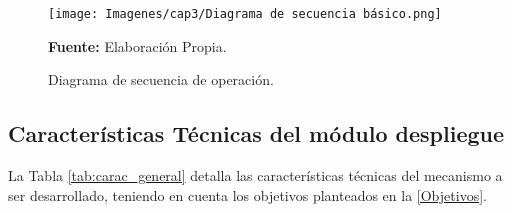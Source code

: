 \begin{figure}[H]
    \centering
    \texttt{[image: Imagenes/cap3/Diagrama de secuencia básico.png]}
    \caption {Diagrama de secuencia de operaci\'on.}{\textbf{Fuente:}
    Elaboraci\'on Propia. }
    \label{fig:diagramaSecuencia}
\end{figure}

\subsection[Caracter\'isticas T\'ecnicas del m\'odulo despliegue]{Caracter\'isticas T\'ecnicas del m\'odulo despliegue}
La Tabla \ref{tab:carac_general} detalla las caracter\'isticas t\'ecnicas del mecanismo a ser desarrollado, teniendo en cuenta los objetivos planteados en la  \autoref{Objetivos}.

